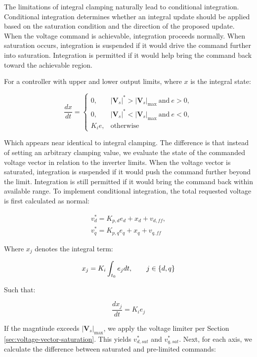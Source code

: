 \documentclass{article}
\begin{document}
The limitations of integral clamping naturally lead to conditional integration. Conditional integration determines whether an integral update should be applied based on the saturation condition and the direction of the proposed update. When the voltage command is achievable, integration proceeds normally. When saturation occurs, integration is suspended if it would drive the command further into saturation. Integration is permitted if it would help bring the command back toward the achievable region.

For a controller with upper and lower output limits, where $x$ is the integral state:

\begin{equation}
    \frac{dx}{dt} = 
    \begin{cases}
        0, & |\mathbf{V}_s|^* > |\mathbf{V}_s|_{\max}\ \text{and}\ e > 0, \\
        0, & |\mathbf{V}_s|^* < |\mathbf{V}_s|_{\max}\ \text{and}\ e < 0, \\
        K_ie, & \text{otherwise}
    \end{cases}
\end{equation}

Which appears near identical to integral clamping. The difference is that instead of setting an arbitrary clamping value, we evaluate the state of the commanded voltage vector in relation to the inverter limits. When the voltage vector is saturated, integration is suspended if it would push the command further beyond the limit. Integration is still permitted if it would bring the command back within available range. To implement conditional integration, the total requested voltage is first calculated as normal:

\begin{align}
    v_d^* = K_{p,d}e_d + x_d + v_{d,ff}, \\
    v_q^* = K_{p,q}e_q + x_q + v_{q,ff}
\end{align}

Where $x_j$ denotes the integral term:

\begin{equation}
    x_j = K_i\int_{t_0}e_j \space dt, \qquad j \in \{d,q\}
\end{equation}

Such that:

\begin{equation}
    \frac{dx_j}{dt} = K_ie_j
\end{equation}

If the magntiude exceeds $|\mathbf{V}_s|_{\max}$, we apply the voltage limiter per Section \ref{sec:voltage-vector-saturation}. This yields $v_{d,sat}^*$ and $v_{q,sat}^*$. Next, for each axis, we calculate the difference between saturated and pre-limited commands:
\end{document}
